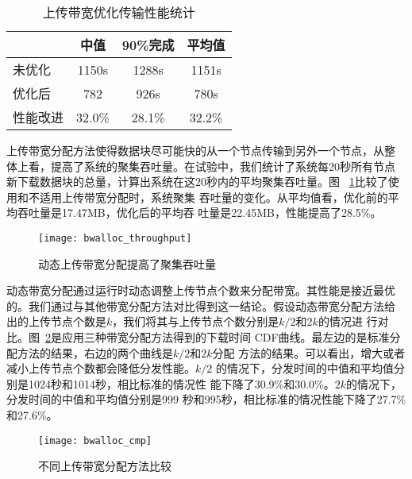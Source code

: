 \begin{table}
\centering
\begin{minipage}{0.8\linewidth}
\centering
\caption{上传带宽优化传输性能统计}
\label{tbl:bwalloc}
\begin{tabular}{lccc}

\toprule[1.5pt]
              & 中值 & 90\%完成 & 平均值\\
\midrule[1pt]
未优化    & 1150s & 1288s & 1151s\\
优化后    & 782   & 926s  & 780s\\
性能改进  & 32.0\% & 28.1\% & 32.2\%\\
\bottomrule[1.5pt]
\end{tabular}
\end{minipage}
\end{table}



上传带宽分配方法使得数据块尽可能快的从一个节点传输到另外一个节点，从整
体上看，提高了系统的聚集吞吐量。在试验中，我们统计了系统每20秒所有节点
新下载数据块的总量，计算出系统在这20秒内的平均聚集吞吐量。图~
\ref{fig:bwalloc_throughput}比较了使用和不适用上传带宽分配时，系统聚集
吞吐量的变化。从平均值看，优化前的平均吞吐量是17.47MB，优化后的平均吞
吐量是22.45MB，性能提高了28.5\%。

\begin{figure}
  \centering
  \begin{minipage}{0.6\linewidth}
    \centering
    \texttt{[image: bwalloc\_throughput]}
    \caption{动态上传带宽分配提高了聚集吞吐量}
    \label{fig:bwalloc_throughput}
  \end{minipage}
\end{figure}


动态带宽分配通过运行时动态调整上传节点个数来分配带宽。其性能是接近最优
的。我们通过与其他带宽分配方法对比得到这一结论。假设动态带宽分配方法给
出的上传节点个数是$k$，我们将其与上传节点个数分别是$k/2$和$2k$的情况进
行对比。图~\ref{fig:bwalloc_cmp}是应用三种带宽分配方法得到的下载时间
CDF曲线。最左边的是标准分配方法的结果，右边的两个曲线是$k/2$和$2k$分配
方法的结果。可以看出，增大或者减小上传节点个数都会降低分发性能。$k/2$
的情况下，分发时间的中值和平均值分别是1024秒和1014秒，相比标准的情况性
能下降了30.9\%和30.0\%。$2k$的情况下，分发时间的中值和平均值分别是999
秒和995秒，相比标准的情况性能下降了27.7\%和27.6\%。

\begin{figure}
  \centering
  \begin{minipage}{0.6\linewidth}
    \centering
    \texttt{[image: bwalloc\_cmp]}
    \caption{不同上传带宽分配方法比较}
    \label{fig:bwalloc_cmp}
  \end{minipage}
\end{figure}

